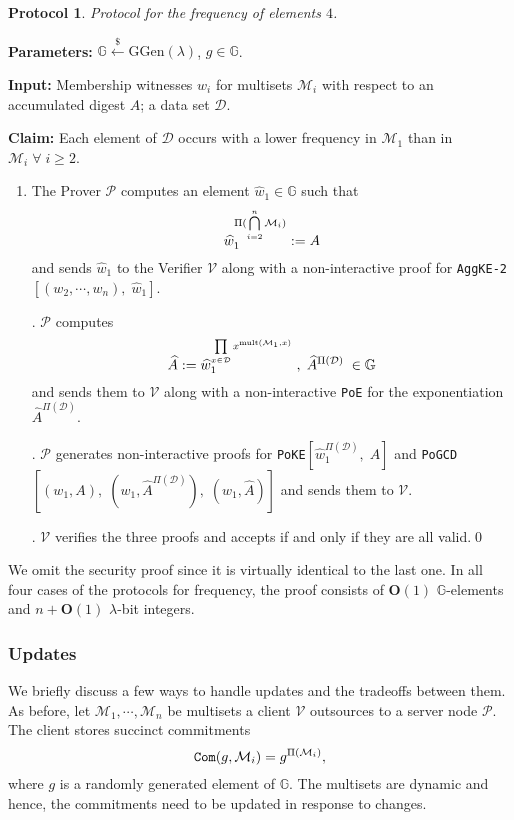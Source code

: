 \documentclass[11pt, lettersize, notitlepage, leqno, footskip=0.6cm]{article}
\newcommand{\pl}{\prod\limits}
\newcommand{\ttt}{\texttt}
\newcommand{\bG}{\mathbb{G}}
\newcommand{\pr}{\protect}
\newcommand{\mc}{\mathcal}
\newcommand{\mb}{\mathbb}
\newcommand{\mbf}{\mathbf}
\newcommand{\mr}{\mathrm}
\newcommand{\lam}{\lambda}
\newcommand{\lamb}{\lambda}
\newcommand{\what}{\widehat}
\newcommand{\bO}{\mbf{O}}
\newcommand{\mP}{\mc{P}}
\newcommand{\V}{\mc{V}}
\newcommand{\vs}{\vspace{-0.15cm}}
\newcommand{\noin}{\noindent}
\newcommand{\nons}{non-interactive proofs}
\newtheorem{Prot}[Thm]{Protocol}
\numberwithin{equation}{section}
\begin{document}
\vspace{0.15cm}

\begin{Prot} Protocol for the frequency of elements $4$.\end{Prot} \vspace{-0.3cm}

\noin \textbf{Parameters:} $\mb{G}\xleftarrow{\$} \mr{GGen}(\lamb)$,\; $g\in \mb{G}$.

\noin \textbf{Input:} Membership witnesses $w_i$ for multisets $\mc{M}_i$ with respect to an accumulated digest $A$; a data set $\mc{D}$.

\noin \textbf{Claim:} Each element of $\mc{D}$ occurs with a lower frequency in $\mc{M}_1$ than in $\mc{M}_i\;\forall\;i\geq 2$. \vs

\begin{enumerate}[wide, labelwidth=!, labelindent=0pt] 

\item The Prover $\mP$ computes an element $\what{w}_1\in\mb{G}$ such that \vs $$\what{w}_1^{\Pi(\bigcap\limits_{i=2}^n \mc{M}_i)}:= A\vs $$ and sends $\what{w}_1$ to the Verifier $\V$ along with a non-interactive proof for \verb|AggKE-2|$[(w_2,\cdots,w_n),\;\what{w}_1]$. 

\noin 2. $\mP$ computes \vs $$\what{A}:= \what{w}_1^{\pl_{x\in\mc{D}}x^{\mr{mult}(\mc{M}_1,x)}}\;,\;\what{A}^{\Pi(\mc{D})}\;\in\mb{G}\vs $$ and sends them to $\V$ along with a non-interactive \verb|PoE| for the exponentiation $\what{A}^{\Pi(\mc{D})}$. 

\noin 3. $\mP$ generates \nons\; for \verb|PoKE|$[\what{w}_1^{\Pi(\mc{D})},\;A]$ and \verb|PoGCD|$[(w_1,A),\;(w_1, \what{A}^{\Pi(\mc{D})}),\;(w_1, \what{A})]$ and sends them to $\V$. 

\noin 4. $\V$ verifies the three proofs and accepts if and only if they are all valid.\qed\end{enumerate}

\noin We omit the security proof since it is virtually identical to the last one. In all four cases of the protocols for frequency, the proof consists of $\bO(1)$ $\bG$-elements and $n+\bO(1)$ $\lam$-bit integers.


\subsubsection{\fontsize{11}{11}\selectfont Updates}

We briefly discuss a few ways to handle updates and the tradeoffs between them. As before, let $\mc{M}_1,\cdots, \mc{M}_n$ be multisets a client $\V$ outsources to a server node $\mP$. The client stores succinct commitments \vs $$\pr{\ttt{Com}}(g, \mc{M}_i) = g^{\Pi(\mc{M}_i)},$$ where $g$ is a randomly generated element of $\bG$. The multisets are dynamic and hence, the commitments need to be updated in response to changes. \vspace{0.15cm}
\end{document}
